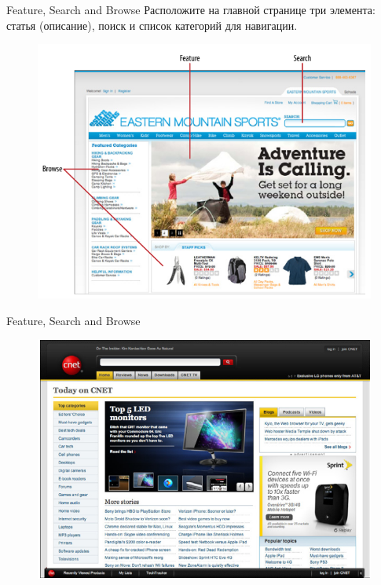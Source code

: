 \documentclass{beamer}
\begin{document}
\begin{frame}[t]{Feature, Search and Browse}
	Расположите на главной странице три элемента: статья (описание), поиск и список категорий для навигации.
	\begin{figure}[h]
		\centering
		\includegraphics[scale=0.5]{images/lec07-pic01.png}
	\end{figure}
\end{frame} 

\begin{frame}[t]{Feature, Search and Browse}
	\begin{figure}[h]
		\centering
		\includegraphics[scale=0.5]{images/lec07-pic02.png}
	\end{figure}
\end{frame} 
\end{document}
